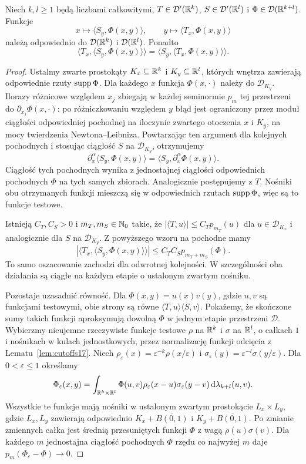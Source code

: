 \begin{lemat}
\label{lem:iterated-distributions21}
Niech $k,l\ge1$ będą liczbami całkowitymi,
$T\in\mathcal D'(\mathbb R^k)$,
$S\in\mathcal D'(\mathbb R^l)$ i
$\Phi\in\mathcal D(\mathbb R^{k+l})$. Funkcje
\[
 x\longmapsto\langle S_y,\Phi(x,y)\rangle,
 \qquad
 y\longmapsto\langle T_x,\Phi(x,y)\rangle
\]
należą odpowiednio do $\mathcal D(\mathbb R^k)$ i
$\mathcal D(\mathbb R^l)$. Ponadto
\[
 \langle T_x,\langle S_y,\Phi(x,y)\rangle\rangle
 =\langle S_y,\langle T_x,\Phi(x,y)\rangle\rangle.
\]
\end{lemat}
\begin{proof}
Ustalmy zwarte prostokąty $K_x\subseteq\mathbb R^k$ i
$K_y\subseteq\mathbb R^l$, których wnętrza zawierają odpowiednie
rzuty $\operatorname{supp}\Phi$. Dla każdego $x$ funkcja $\Phi(x,\cdot)$
należy do $\mathcal D_{K_y}$. Ilorazy różnicowe względem
$x_j$ zbiegają w każdej seminormie $p_m$ tej przestrzeni
do $\partial_{x_j}\Phi(x,\cdot)$: po różniczkowaniu
względem $y$ błąd jest ograniczony przez moduł ciągłości
odpowiedniej pochodnej na iloczynie zwartego otoczenia $x$
i $K_y$, na mocy twierdzenia Newtona--Leibniza.
Powtarzając ten argument dla kolejnych pochodnych i
stosując ciągłość $S$ na $\mathcal D_{K_y}$, otrzymujemy
\[
 \partial_x^\alpha\langle S_y,\Phi(x,y)\rangle
 =\langle S_y,\partial_x^\alpha\Phi(x,y)\rangle.
\]
Ciągłość tych pochodnych wynika z jednostajnej ciągłości
odpowiednich pochodnych $\Phi$ na tych samych zbiorach.
Analogicznie postępujemy z $T$. Nośniki obu otrzymanych
funkcji mieszczą się w odpowiednich rzutach $\operatorname{supp}\Phi$,
więc są to funkcje testowe.

Istnieją $C_T,C_S>0$ i $m_T,m_S\in\mathbb N_0$ takie, że
$|\langle T,u\rangle|\le C_Tp_{m_T}(u)$ dla
$u\in\mathcal D_{K_x}$ i analogicznie dla $S$ na
$\mathcal D_{K_y}$. Z powyższego wzoru na pochodne mamy
\[
 |\langle T_x,\langle S_y,\Phi(x,y)\rangle\rangle|
 \le C_TC_S p_{m_T+m_S}(\Phi).
\]
To samo oszacowanie zachodzi dla odwrotnej kolejności.
W szczególności oba działania są ciągłe na każdym etapie
o ustalonym zwartym nośniku.

Pozostaje uzasadnić równość. Dla $\Phi(x,y)=u(x)v(y)$,
gdzie $u,v$ są funkcjami testowymi, obie strony są równe
$\langle T,u\rangle\langle S,v\rangle$.
Pokażemy, że skończone sumy takich funkcji aproksymują
dowolną $\Phi$ w jednym etapie przestrzeni $\mathcal D$.
Wybierzmy nieujemne rzeczywiste funkcje testowe
$\rho$ na $\mathbb R^k$ i $\sigma$ na $\mathbb R^l$, o całkach $1$
i nośnikach w kulach jednostkowych, przez normalizację
funkcji odcięcia z Lematu~\ref{lem:cutoffs17}.
Niech $\rho_\varepsilon(x)=\varepsilon^{-k}\rho(x/\varepsilon)$
i $\sigma_\varepsilon(y)=\varepsilon^{-l}\sigma(y/\varepsilon)$.
Dla $0<\varepsilon\le1$ określamy
\[
 \Phi_\varepsilon(x,y)=
 \int_{\mathbb R^k\times\mathbb R^l}\Phi(u,v)
 \rho_\varepsilon(x-u)\sigma_\varepsilon(y-v)
 \,\mathrm d\lambda_{k+l}(u,v).
\]
Wszystkie te funkcje mają nośniki w ustalonym zwartym
prostokącie $L_x\times L_y$, gdzie $L_x,L_y$ zawierają
odpowiednio $K_x+\overline{B(0,1)}$ i
$K_y+\overline{B(0,1)}$. Po zmianie zmiennych całka
jest średnią przesuniętych funkcji $\Phi$ z wagą
$\rho(u)\sigma(v)$. Dla każdego $m$ jednostajna ciągłość
pochodnych $\Phi$ rzędu co najwyżej $m$ daje
$p_m(\Phi_\varepsilon-\Phi)\to0$.


\end{proof}
